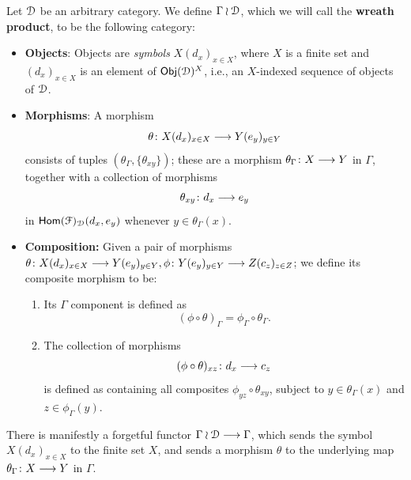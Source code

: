 \begin{definition}\label{ch6:: def: wreath_product}
    Let $\mathcal D$ be an arbitrary category. We define $\Gamma \wr \mathcal D$, which we will call the \textbf{wreath product}, to be the following category:
    \begin{itemize}
        \item\textbf{Objects}: Objects are \emph{symbols} $X(d_{x})_{x \in X}$, where $X$ is a finite set and $(d_{x})_{x\in X}$ is an element of $\mathsf{Obj}(\mathcal D)^{X}$, i.e., an $X$-indexed sequence of objects of $\mathcal D$.
        \item\textbf{Morphisms}: A morphism 
        \begin{equation}
            \theta \colon X(d_{x})_{x \in X} \longrightarrow Y(e_{y})_{y \in Y}  
        \end{equation}
        consists of tuples $(\theta_{\Gamma},\{\theta_{xy}\})$; these are a morphism $\theta_\Gamma \colon X \longrightarrow Y$ in $\Gamma$, together with a collection of morphisms 
        \begin{equation}
            \theta_{xy} \colon d_x \longrightarrow e_y
        \end{equation}
        in $\mathsf{Hom}(\mathcal F)_{\mathcal D}(d_x,e_y)$ whenever $y\in \theta_{\Gamma}(x)$.
        \item \textbf{Composition:} Given a pair of morphisms $\theta \colon X(d_x)_{x \in X} \longrightarrow Y(e_y)_{y\in Y}, \phi \colon Y(e_y)_{y\in Y} \longrightarrow Z(c_z)_{z\in Z}$; we define its composite morphism to be:
        \begin{enumerate}
            \item Its $\Gamma$ component is defined as 
            \begin{equation}
                (\phi \circ \theta)_{\Gamma} = \phi_\Gamma \circ \theta_{\Gamma}.
            \end{equation}
            \item The collection of morphisms 
            \begin{equation}
                (\phi \circ \theta)_{xz} \colon d_x \longrightarrow c_{z}
            \end{equation}
            is defined as containing all composites $\phi_{yz}\circ \theta_{xy}$, subject to $y \in \theta_\Gamma (x)$ and $z \in \phi_\Gamma(y)$.
        \end{enumerate}
    \end{itemize} 
\end{definition}

There is manifestly a forgetful functor $\Gamma \wr \mathcal D \longrightarrow \Gamma$, which sends the symbol $X(d_x)_{x\in X}$ to the finite set $X$, and sends a morphism $\theta$ to the underlying map $\theta_\Gamma\colon X \longrightarrow Y$ in $\Gamma$. 

